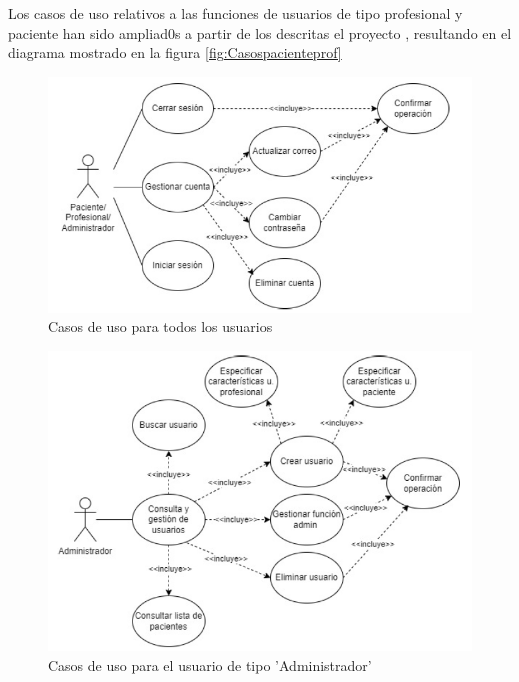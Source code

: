 Los casos de uso relativos a las funciones de usuarios de tipo profesional y paciente han sido ampliad0s a partir de los descritas el proyecto \cite{Martos2024}, resultando en el diagrama mostrado en la figura \ref{fig:Casospacienteprof}
\begin{figure}[h]
    \centering
    \includegraphics[width=1\textwidth]{img/casosinestodos.png}
    \caption{Casos de uso para todos los usuarios \cite{Martos2024}}
    \label{fig:Casosusotodos}
\end{figure}

\begin{figure}[h]
    \centering
    \includegraphics[width=1\textwidth]{img/casosinesadmin.png}
    \caption{Casos de uso para el usuario de tipo 'Administrador' \cite{Martos2024}}
    \label{fig:Casosusoadmin}
\end{figure}

